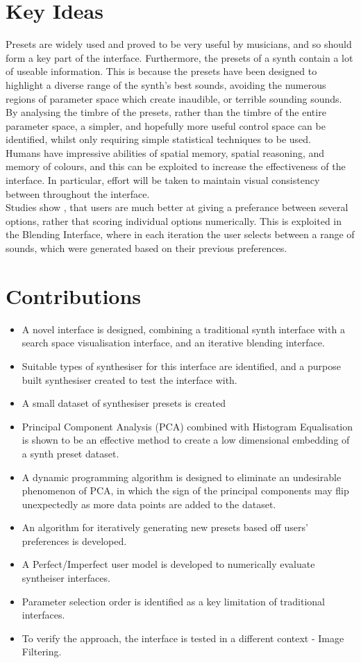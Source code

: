 \documentclass[11pt, oneside]{report}   	%
\begin{document}
\section{Key Ideas}
Presets are widely used and proved to be very useful by musicians, and so should form a key part of the interface. Furthermore, the presets of a synth contain a lot of useable information. This is because the presets have been designed to highlight a diverse range of the synth's best sounds, avoiding the numerous regions of parameter space which create inaudible, or terrible sounding sounds. By analysing the timbre of the presets, rather than the timbre of the entire parameter space, a simpler, and hopefully more useful control space can be identified, whilst only requiring simple statistical techniques to be used.\\
%
Humans have impressive abilities of spatial memory, spatial reasoning, and memory of colours, and this can be exploited to increase the effectiveness of the interface. In particular, effort will be taken to maintain visual consistency between throughout the interface.\\
%
Studies show \cite{RatingRanking}, that users are much better at giving a preferance between several options, rather that scoring individual options numerically. This is exploited in the Blending Interface, where in each iteration the user selects between a range of sounds, which were generated based on their previous preferences.
%
\section{Contributions}
\begin{itemize}
	\setlength\itemsep{-1.0em}
	\item A novel interface is designed, combining a traditional synth interface with a search space visualisation interface, and an iterative blending interface.
	\item Suitable types of synthesiser for this interface are identified, and a purpose built synthesiser created to test the interface with.
	\item A small dataset of synthesiser presets is created
	\item Principal Component Analysis (PCA) combined with Histogram Equalisation is shown to be an effective method to create a low dimensional embedding of a synth preset dataset.
	\item A dynamic programming algorithm is designed to eliminate an undesirable phenomenon of PCA, in which the sign of the principal components may flip unexpectedly as more data points are added to the dataset.
	\item An algorithm for iteratively generating new presets based off users' preferences is developed.
	\item A Perfect/Imperfect user model is developed to numerically evaluate syntheiser interfaces.
	\item Parameter selection order is identified as a key limitation of traditional interfaces.
	\item To verify the approach, the interface is tested in a different context - Image Filtering.
\end{itemize}
\end{document}
